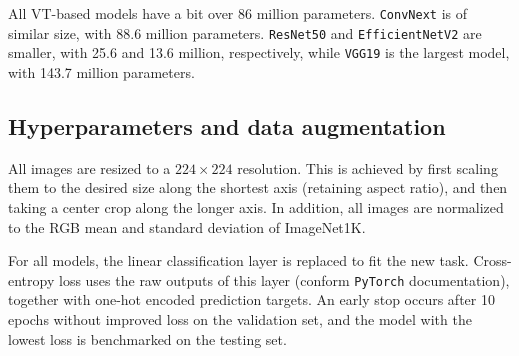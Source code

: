 

All VT-based models have a bit over 86 million parameters. \texttt{ConvNext} is of similar size, with 88.6 million parameters. \texttt{ResNet50} and \texttt{EfficientNetV2} are smaller, with 25.6 and 13.6 million, respectively, while \texttt{VGG19} is the largest model, with 143.7 million parameters.


\subsection{Hyperparameters and data augmentation}
All images are resized to a $224 \times 224$ resolution. This is achieved by first scaling them to the desired size along the shortest axis (retaining aspect ratio), and then taking a center crop along the longer axis. In addition, all images are normalized to the RGB mean and standard deviation of ImageNet1K.

For all models, the linear classification layer is replaced to fit the new task. Cross-entropy loss uses the raw outputs of this layer (conform \texttt{PyTorch} documentation), together with one-hot encoded prediction targets. An early stop occurs after 10 epochs without improved loss on the validation set, and the model with the lowest loss is benchmarked on the testing set.

